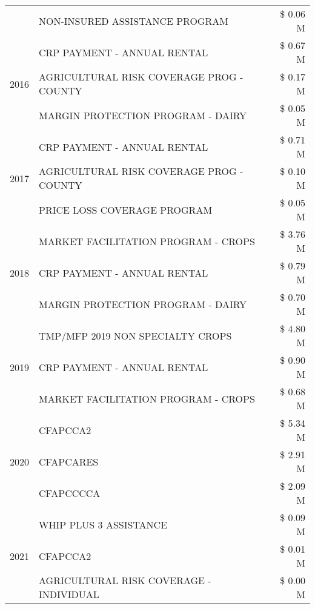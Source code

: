 \begin{tabular}{llr}
 & NON-INSURED ASSISTANCE PROGRAM & \$ 0.06 M \\
\cline{1-3}
\multirow[t]{3}{*}{2016} & CRP PAYMENT - ANNUAL RENTAL & \$ 0.67 M \\
 & AGRICULTURAL RISK COVERAGE PROG - COUNTY & \$ 0.17 M \\
 & MARGIN PROTECTION PROGRAM - DAIRY & \$ 0.05 M \\
\cline{1-3}
\multirow[t]{3}{*}{2017} & CRP PAYMENT - ANNUAL RENTAL & \$ 0.71 M \\
 & AGRICULTURAL RISK COVERAGE PROG - COUNTY & \$ 0.10 M \\
 & PRICE LOSS COVERAGE PROGRAM & \$ 0.05 M \\
\cline{1-3}
\multirow[t]{3}{*}{2018} & MARKET FACILITATION PROGRAM - CROPS & \$ 3.76 M \\
 & CRP PAYMENT - ANNUAL RENTAL & \$ 0.79 M \\
 & MARGIN PROTECTION PROGRAM - DAIRY & \$ 0.70 M \\
\cline{1-3}
\multirow[t]{3}{*}{2019} & TMP/MFP 2019 NON SPECIALTY CROPS & \$ 4.80 M \\
 & CRP PAYMENT - ANNUAL RENTAL & \$ 0.90 M \\
 & MARKET FACILITATION PROGRAM - CROPS & \$ 0.68 M \\
\cline{1-3}
\multirow[t]{3}{*}{2020} & CFAPCCA2 & \$ 5.34 M \\
 & CFAPCARES & \$ 2.91 M \\
 & CFAPCCCCA & \$ 2.09 M \\
\cline{1-3}
\multirow[t]{3}{*}{2021} & WHIP PLUS 3 ASSISTANCE & \$ 0.09 M \\
 & CFAPCCA2 & \$ 0.01 M \\
 & AGRICULTURAL RISK COVERAGE - INDIVIDUAL & \$ 0.00 M \\
\cline{1-3}
\bottomrule
\end{tabular}
